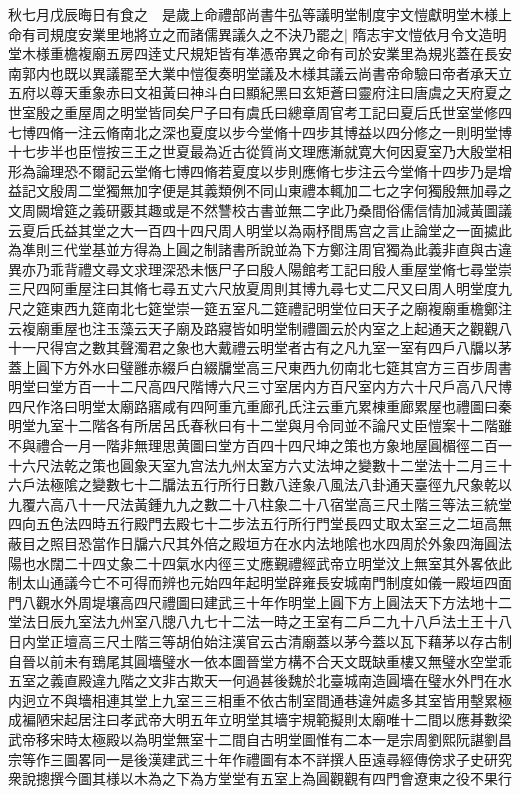 秋七月戊辰晦日有食之　是歲上命禮部尚書牛弘等議明堂制度宇文愷獻明堂木様上命有司規度安業里地將立之而諸儒異議久之不決乃罷之|{
	隋志宇文愷依月令文造明堂木様重檐複廟五房四逹丈尺規矩皆有凖憑帝異之命有司於安業里為規兆蓋在長安南郭内也既以異議罷至大業中愷復奏明堂議及木様其議云尚書帝命驗曰帝者承天立五府以尊天重象赤曰文祖黃曰神斗白曰顯紀黑曰玄矩蒼曰靈府注曰唐虞之天府夏之世室殷之重屋周之明堂皆同矣尸子曰有虞氏曰總章周官考工記曰夏后氏世室堂修四七博四脩一注云脩南北之深也夏度以步今堂脩十四步其博益以四分修之一則明堂博十七步半也臣愷按三王之世夏最為近古從質尚文理應漸就寛大何因夏室乃大殷堂相形為論理恐不爾記云堂脩七博四脩若夏度以步則應脩七步注云今堂脩十四步乃是增益記文殷周二堂獨無加字便是其義類例不同山東禮本輒加二七之字何獨殷無加尋之文周闕增筵之義研覈其趣或是不然讐校古書並無二字此乃桑間俗儒信情加減黃圖議云夏后氏益其堂之大一百四十四尺周人明堂以為兩杼間馬宫之言止論堂之一面㨿此為凖則三代堂基並方得為上圓之制諸書所說並為下方鄭注周官獨為此義非直與古違異亦乃乖背禮文尋文求理深恐未愜尸子曰殷人陽館考工記曰殷人重屋堂脩七尋堂崇三尺四阿重屋注曰其脩七尋五丈六尺放夏周則其博九尋七丈二尺又曰周人明堂度九尺之筵東西九筵南北七筵堂崇一筵五室凡二筵禮記明堂位曰天子之廟複廟重檐鄭注云複廟重屋也注玉藻云天子廟及路寢皆如明堂制禮圖云於内室之上起通天之觀觀八十一尺得宫之數其聲濁君之象也大戴禮云明堂者古有之凡九室一室有四戶八牖以茅蓋上圓下方外水曰璧雝赤綴戶白綴牖堂高三尺東西九仞南北七筵其宫方三百步周書明堂曰堂方百一十二尺高四尺階博六尺三寸室居内方百尺室内方六十尺戶高八尺博四尺作洛曰明堂太廟路寤咸有四阿重亢重廊孔氏注云重亢累棟重廊累屋也禮圖曰秦明堂九室十二階各有所居呂氏春秋曰有十二堂與月令同並不論尺丈臣愷案十二階雖不與禮合一月一階非無理思黄圖曰堂方百四十四尺坤之策也方象地屋圓楣徑二百一十六尺法乾之策也圓象天室九宫法九州太室方六丈法坤之變數十二堂法十二月三十六戶法極隂之變數七十二牖法五行所行日數八逹象八風法八卦通天臺徑九尺象乾以九覆六高八十一尺法黃鍾九九之數二十八柱象二十八宿堂高三尺土階三等法三統堂四向五色法四時五行殿門去殿七十二步法五行所行門堂長四丈取太室三之二垣高無蔽目之照目恐當作日牖六尺其外倍之殿垣方在水内法地隂也水四周於外象四海圓法陽也水闊二十四丈象二十四氣水内徑三丈應覲禮經武帝立明堂汶上無室其外畧依此制太山通議今亡不可得而辨也元始四年起明堂辟雍長安城南門制度如儀一殿垣四面門八觀水外周堤壤高四尺禮圖曰建武三十年作明堂上圓下方上圓法天下方法地十二堂法日辰九室法九州室八牕八九七十二法一時之王室有二戶二九十八戶法土王十八日内堂正壇高三尺土階三等胡伯始注漢官云古清廟蓋以茅今蓋以瓦下藉茅以存古制自晉以前未有鵄尾其圓墻璧水一依本圖晉堂方構不合天文既缺重樓又無璧水空堂乖五室之義直殿違九階之文非古欺天一何過甚後魏於北臺城南造圓墻在璧水外門在水内迥立不與墻相連其堂上九室三三相重不依古制室間通巷違舛處多其室皆用墼累極成褊陋宋起居注曰孝武帝大明五年立明堂其墻宇規範擬則太廟唯十二間以應朞數梁武帝移宋時太極殿以為明堂無室十二間自古明堂圖惟有二本一是宗周劉熙阮諶劉昌宗等作三圖畧同一是後漢建武三十年作禮圖有本不詳撰人臣遠尋經傳傍求子史研究衆說摠撰今圖其様以木為之下為方堂堂有五室上為圓觀觀有四門會遼東之役不果行}
